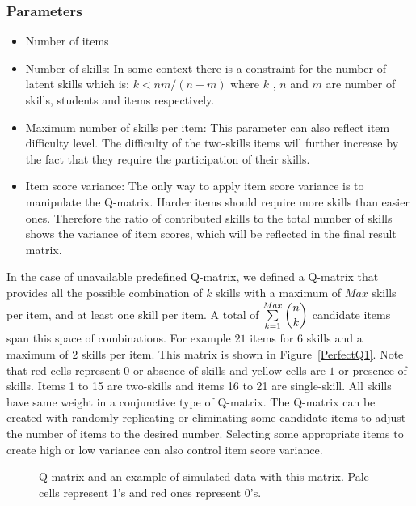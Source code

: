 \subsubsection{Parameters}
\begin{itemize}
\item Number of items 
\item Number of skills: In some context there is a constraint for the number of latent skills which is: $k<nm/(n+m)$ \protect\citep{lee1999learning} where $k$ , $n$ and $m$ are number of skills, students and items respectively.
\item Maximum number of skills per item: This parameter can also reflect item difficulty level. The difficulty of the two-skills items will further increase by the fact that they require the participation of their skills.
\item Item score variance: The only way to apply item score variance is to manipulate the Q-matrix. Harder items should require more skills than easier ones. Therefore the ratio of contributed skills to the total number of skills shows the variance of item scores, which will be reflected in the final result matrix.
\end{itemize}



In the case of unavailable predefined Q-matrix, we defined a Q-matrix that provides all the possible combination of $k$ skills with a maximum of $Max$ skills per item, and at least one skill per item. A total of $\sum\limits_{k=1}^{Max} \dbinom{n}{k}$ candidate items span this space of combinations. For example $21$ items for $6$ skills and a maximum of $2$ skills per item. This matrix is shown in Figure~\ref{PerfectQ1}. Note that red cells represent $0$ or absence of skills and yellow cells are $1$ or presence of skills. Items 1 to 15 are two-skills and items 16 to 21 are single-skill. All skills have same weight in a conjunctive type of Q-matrix. The Q-matrix can be created with randomly replicating or eliminating some candidate items to adjust the number of items to the desired number. Selecting some appropriate items to create high or low variance can also control item score variance.

\begin{figure}[ht]
\centering

\quad
\caption{Q-matrix and an example of simulated data with this matrix. Pale cells represent 1's and red ones represent 0's.}
\label{figqmatrixandResutM}
\end{figure}



